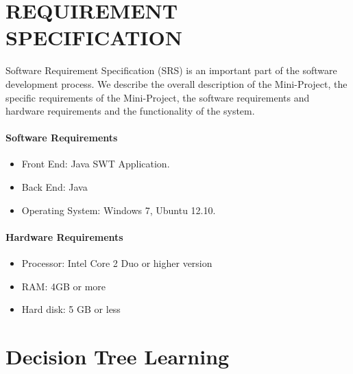 \documentclass[12pt]{report}
\begin{document}
\pagestyle{fancy}
\chead{}
\rfoot{\small{\thepage}}
\renewcommand{\headrulewidth}{0.4pt}
\renewcommand{\footrulewidth}{0.4pt}
\chapter{REQUIREMENT SPECIFICATION}
Software Requirement Specification (SRS) is an important part of the  software development process. We describe the overall description of the Mini-Project, the specific requirements of the Mini-Project, the software requirements and hardware requirements and the functionality of the system.

\subsubsection{Software Requirements}
\begin{itemize}

\item{	Front End: Java SWT Application.}
\item{	Back End: Java}
\item{	Operating System: Windows 7, Ubuntu 12.10.}

\end{itemize}

\subsubsection{Hardware Requirements}
\begin{itemize}
\item{Processor: Intel Core 2 Duo or higher version}
\item{RAM: 4GB or more}
\item{Hard disk: 5 GB or less}
\end{itemize}

%
\pagestyle{fancy}
\chead{}
\rfoot{\small{\thepage}}
\renewcommand{\headrulewidth}{0.4pt}
\renewcommand{\footrulewidth}{0.4pt}
\chapter{Decision Tree Learning}
\end{document}
